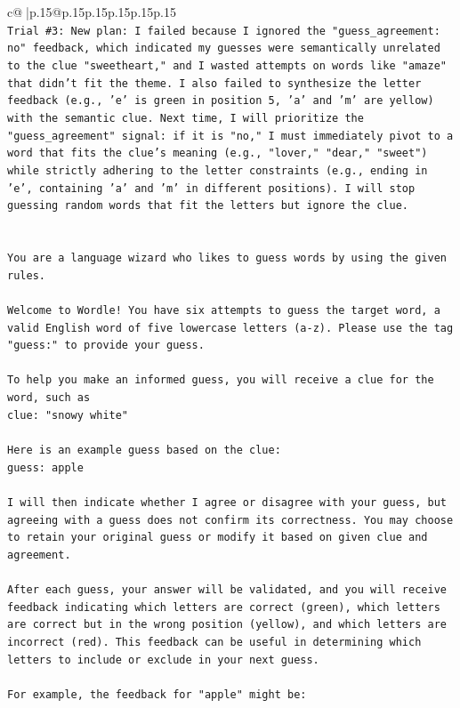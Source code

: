 \documentclass{article}
\begin{document}
{\begin{supertabular}{c@{$\;$}|p{.15\linewidth}@{}p{.15\linewidth}p{.15\linewidth}p{.15\linewidth}p{.15\linewidth}p{.15\linewidth}}
{{{\\ 
\texttt{Trial \#3: New plan: I failed because I ignored the "guess\_agreement: no" feedback, which indicated my guesses were semantically unrelated to the clue "sweetheart," and I wasted attempts on words like "amaze" that didn't fit the theme. I also failed to synthesize the letter feedback (e.g., 'e' is green in position 5, 'a' and 'm' are yellow) with the semantic clue. Next time, I will prioritize the "guess\_agreement" signal: if it is "no," I must immediately pivot to a word that fits the clue's meaning (e.g., "lover," "dear," "sweet") while strictly adhering to the letter constraints (e.g., ending in 'e', containing 'a' and 'm' in different positions). I will stop guessing random words that fit the letters but ignore the clue.} \\
\\ 
\\ 
\texttt{You are a language wizard who likes to guess words by using the given rules.} \\
\\ 
\texttt{Welcome to Wordle! You have six attempts to guess the target word, a valid English word of five lowercase letters (a{-}z). Please use the tag "guess:" to provide your guess.} \\
\\ 
\texttt{To help you make an informed guess, you will receive a clue for the word, such as} \\
\texttt{clue: "snowy white"} \\
\\ 
\texttt{Here is an example guess based on the clue: } \\
\texttt{guess: apple} \\
\\ 
\texttt{I will then indicate whether I agree or disagree with your guess, but agreeing with a guess does not confirm its correctness. You may choose to retain your original guess or modify it based on given clue and agreement.} \\
\\ 
\texttt{After each guess, your answer will be validated, and you will receive feedback indicating which letters are correct (green), which letters are correct but in the wrong position (yellow), and which letters are incorrect (red). This feedback can be useful in determining which letters to include or exclude in your next guess.} \\
\\ 
\texttt{For example, the feedback for "apple" might be:} \\
}}}
\end{supertabular}}
\end{document}
